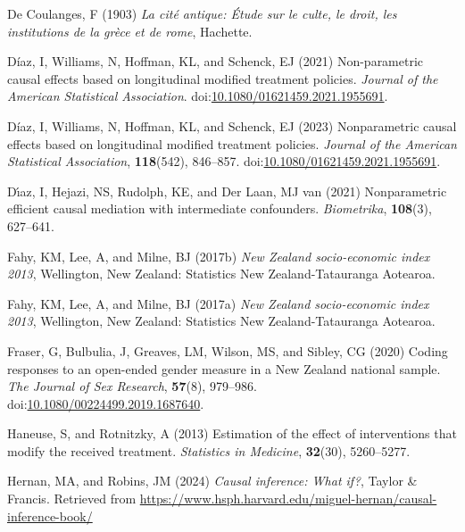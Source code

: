 \documentclass[
  single column]{article}
\newlength{\cslhangindent}
\newenvironment{CSLReferences}[2] %
 {\begin{list}{}{%
  \setlength{\itemindent}{0pt}
  \setlength{\leftmargin}{0pt}
  \setlength{\parsep}{0pt}
  \ifodd #1
   \setlength{\leftmargin}{\cslhangindent}
   \setlength{\itemindent}{-1\cslhangindent}
  \fi
  \setlength{\itemsep}{#2\baselineskip}}}
 {\end{list}}
\begin{document}
\begin{CSLReferences}{1}{0}
De Coulanges, F (1903) \emph{La cité antique: Étude sur le culte, le
droit, les institutions de la grèce et de rome}, Hachette.

Díaz, I, Williams, N, Hoffman, KL, and Schenck, EJ (2021) Non-parametric
causal effects based on longitudinal modified treatment policies.
\emph{Journal of the American Statistical Association}.
doi:\href{https://doi.org/10.1080/01621459.2021.1955691}{10.1080/01621459.2021.1955691}.

Díaz, I, Williams, N, Hoffman, KL, and Schenck, EJ (2023) Nonparametric
causal effects based on longitudinal modified treatment policies.
\emph{Journal of the American Statistical Association},
\textbf{118}(542), 846--857.
doi:\href{https://doi.org/10.1080/01621459.2021.1955691}{10.1080/01621459.2021.1955691}.

Dı́az, I, Hejazi, NS, Rudolph, KE, and Der Laan, MJ van (2021)
Nonparametric efficient causal mediation with intermediate confounders.
\emph{Biometrika}, \textbf{108}(3), 627--641.

Fahy, KM, Lee, A, and Milne, BJ (2017b) \emph{New Zealand socio-economic
index 2013}, Wellington, New Zealand: Statistics New Zealand-Tatauranga
Aotearoa.

Fahy, KM, Lee, A, and Milne, BJ (2017a) \emph{New Zealand socio-economic
index 2013}, Wellington, New Zealand: Statistics New Zealand-Tatauranga
Aotearoa.

Fraser, G, Bulbulia, J, Greaves, LM, Wilson, MS, and Sibley, CG (2020)
Coding responses to an open-ended gender measure in a {N}ew {Z}ealand
national sample. \emph{The Journal of Sex Research}, \textbf{57}(8),
979--986.
doi:\href{https://doi.org/10.1080/00224499.2019.1687640}{10.1080/00224499.2019.1687640}.

Haneuse, S, and Rotnitzky, A (2013) Estimation of the effect of
interventions that modify the received treatment. \emph{Statistics in
Medicine}, \textbf{32}(30), 5260--5277.

Hernan, MA, and Robins, JM (2024) \emph{Causal inference: What if?},
Taylor \& Francis. Retrieved from
\url{https://www.hsph.harvard.edu/miguel-hernan/causal-inference-book/}


\end{CSLReferences}
\end{document}
